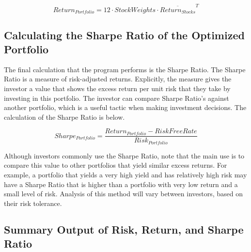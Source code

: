 \documentclass[12pt,english]{article}
\begin{document}
\begin{doublespace}
                \begin{center}
                    \begin{equation} \label{Portfolio Return}
                        Return_{Portfolio} = 
                        12 \cdot StockWeights\cdot \overline{Return_{Stocks}}^{T}
                    \end{equation}
                \end{center}
        
        \subsection{Calculating the Sharpe Ratio of the Optimized Portfolio}

            \indent{}\indent{}
            The final calculation that the program performs is the Sharpe Ratio. The Sharpe Ratio is a measure of risk-adjusted returns. Explicitly, the measure gives the investor a value that shows the excess return per unit risk that they take by investing in this portfolio. The investor can compare Sharpe Ratio’s against another portfolio, which is a useful tactic when making investment decisions. The calculation of the Sharpe Ratio is below.
            	
                \begin{center}
                    \begin{equation} \label{Sharpe Ratio}
                        Sharpe_{Portfolio} = 
                        \frac{Return_{Portfolio} - RiskFreeRate}{Risk_{Portfolio}} 
                    \end{equation}
                \end{center}
                
            \indent{}
            Although investors commonly use the Sharpe Ratio, note that the main use is to compare this value to other portfolios that yield similar excess returns. For example, a portfolio that yields a very high yield and has relatively high risk may have a Sharpe Ratio that is higher than a portfolio with very low return and a small level of risk. Analysis of this method will vary between investors, based on their risk tolerance.
            
        \subsection{Summary Output of Risk, Return, and Sharpe Ratio}
            

\end{doublespace}
\end{document}
